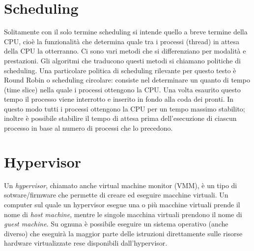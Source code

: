 \section{Scheduling}
Solitamente con il solo termine scheduling si intende quello a breve termine della CPU, cioè la funzionalità che determina quale tra i processi (thread) in attesa della CPU la otterranno. Ci sono vari metodi che si differenziano per modalità e prestazioni. Gli algoritmi che traducono questi metodi si chiamano politiche di scheduling.
Una particolare politica di scheduling rilevante per questo testo è Round Robin o scheduling circolare: consiste nel determinare un quanto di tempo (time slice) nella quale i processi ottengono la CPU. Una volta esaurito questo tempo il processo viene interrotto e inserito in fondo alla coda dei pronti. In questo modo tutti i processi ottengono la CPU per un tempo massimo stabilito; inoltre è possibile stabilire il tempo di attesa prima dell'esecuzione di ciascun processo in base al numero di processi che lo precedono.

\section{Hypervisor}
Un \textit{hypervisor}, chiamato anche virtual machine monitor (VMM), è un tipo di sotware/firmware che permette di creare ed eseguire macchine virtuali. Un computer sul quale un hypervisor esegue una o più macchine virtuali prende il nome di \textit{host machine}, mentre le singole macchina virtuali prendono il nome di \textit{guest machine}. Su ognuna è possibile eseguire un sistema operativo (anche diverso) che eseguirà la maggior parte delle istruzioni direttamente sulle risorse hardware virtualizzate rese disponibili dall'hypervisor.